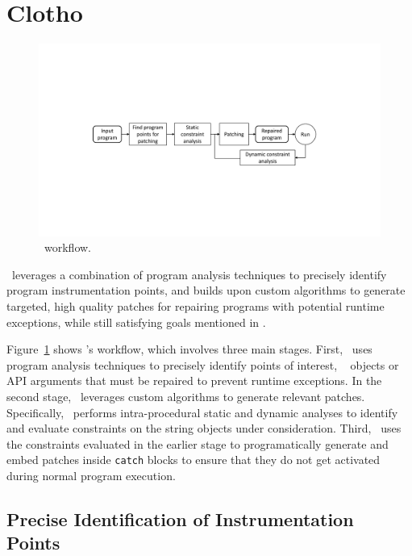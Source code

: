 \section{Clotho}
\label{sec:design}

\begin{figure}[t]
\centering
\includegraphics[scale=.38]{images/NewDesignDiagram.pdf}
\caption{\tool\ workflow.}
\label{fig:overallDesign}
\end{figure}

 \tool\ leverages a combination of program 
analysis techniques to precisely identify program instrumentation points, and
builds upon custom algorithms to generate targeted, high quality patches for
repairing programs with potential runtime exceptions, while still satisfying
goals mentioned in .

Figure~\ref{fig:overallDesign} shows \tool's workflow, which involves three
main stages. First, \tool\ uses program analysis techniques to precisely
identify points of interest, \ie\  objects or API arguments that
must be repaired to prevent runtime exceptions. In the second stage, \tool\ leverages
custom algorithms to generate relevant patches. Specifically, \tool\ performs
intra-procedural static and dynamic analyses to identify and evaluate
constraints on the string objects under consideration. Third, \tool\ uses the
constraints evaluated in the earlier stage to programatically generate and embed
patches inside \texttt{catch} blocks to ensure that they do not get activated
during normal program execution.

\subsection{Precise Identification of Instrumentation Points}
\label{sec:tool:stage1}

